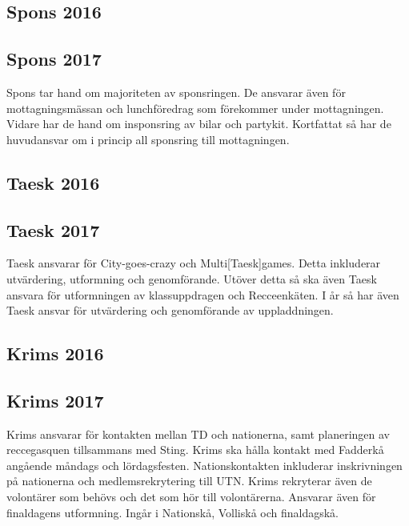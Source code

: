 \documentclass[a4paper]{article}
\begin{document}
\subsection{Spons 2016}



\subsection{Spons 2017}

Spons tar hand om majoriteten av sponsringen. De 
ansvarar även för mottagningsmässan och lunchföredrag 
som förekommer under mottagningen. Vidare har de hand 
om insponsring av bilar och partykit. Kortfattat så 
har de huvudansvar om i princip all sponsring till 
mottagningen. 

\subsection{Taesk 2016}



\subsection{Taesk 2017}

Taesk ansvarar för City-goes-crazy och 
Multi[Taesk]games. Detta inkluderar utvärdering, 
utformning och genomförande. Utöver detta så ska även 
Taesk ansvara för utformningen av klassuppdragen och 
Recceenkäten. I år så har även Taesk ansvar för 
utvärdering och genomförande av uppladdningen. 

\subsection{Krims 2016}



\subsection{Krims 2017}

Krims ansvarar för kontakten mellan TD och nationerna, 
samt planeringen av reccegasquen tillsammans med 
Sting. Krims ska hålla kontakt med Fadderkå angående 
måndags och lördagsfesten. Nationskontakten inkluderar 
inskrivningen på nationerna och medlemsrekrytering 
till UTN. Krims rekryterar även de volontärer som 
behövs och det som hör till volontärerna. Ansvarar 
även för finaldagens utformning. Ingår i Nationskå, 
Volliskå och finaldagskå.
\end{document}
